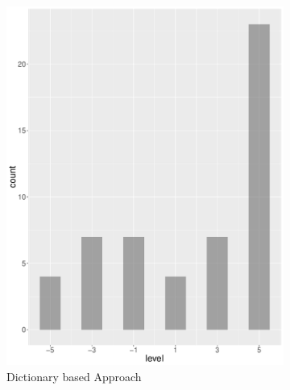 \begin{figure}
\begin{subfigure}[b]{0.4\textwidth}
        \includegraphics[width=\textwidth]{plots/tennis/hist_level_es}
        \caption{Dictionary based Approach}
        \label{fig:hist_level_tennis_es}
    \end{subfigure}
    ~
    \begin{subfigure}[b]{0.4\textwidth}

\end{subfigure}
\end{figure}
